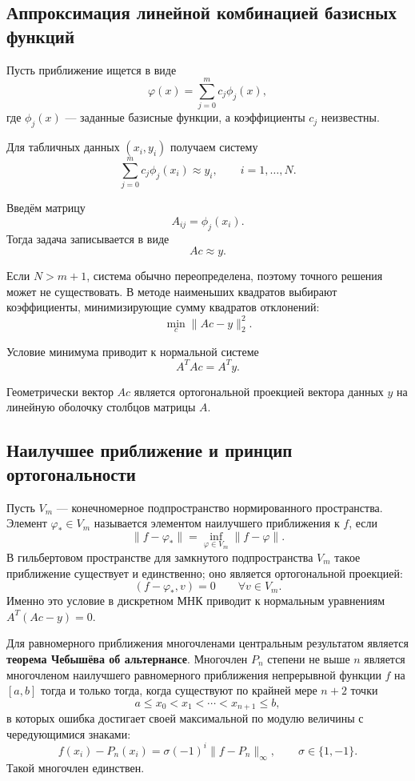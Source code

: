 \subsection{Аппроксимация линейной комбинацией базисных функций}

Пусть приближение ищется в виде
\[
\varphi(x)
=
\sum_{j=0}^{m} c_j\phi_j(x),
\]
где $\phi_j(x)$ --- заданные базисные функции, а коэффициенты $c_j$ неизвестны.

Для табличных данных $(x_i,y_i)$ получаем систему
\[
\sum_{j=0}^{m}c_j\phi_j(x_i)\approx y_i,
\qquad
i=1,\ldots,N.
\]

Введём матрицу
\[
A_{ij}=\phi_j(x_i).
\]
Тогда задача записывается в виде
\[
Ac\approx y.
\]

Если $N>m+1$, система обычно переопределена, поэтому точного решения
может не существовать. В методе наименьших квадратов выбирают коэффициенты,
минимизирующие сумму квадратов отклонений:
\[
\min_c \|Ac-y\|_2^2.
\]

Условие минимума приводит к нормальной системе
\[
A^{T}Ac=A^{T}y.
\]

Геометрически вектор $Ac$ является ортогональной проекцией вектора данных
$y$ на линейную оболочку столбцов матрицы $A$.

\subsection{Наилучшее приближение и принцип ортогональности}

Пусть $V_m$ --- конечномерное подпространство нормированного пространства.
Элемент $\varphi_*\in V_m$ называется элементом наилучшего приближения к $f$, если
\[
    \|f-\varphi_*\|
    =\inf_{\varphi\in V_m}\|f-\varphi\|.
\]
В гильбертовом пространстве для замкнутого подпространства $V_m$ такое
приближение существует и единственно; оно является ортогональной проекцией:
\[
    (f-\varphi_*,v)=0
    \qquad\forall v\in V_m.
\]
Именно это условие в дискретном МНК приводит к нормальным уравнениям
$A^T(Ac-y)=0$.

Для равномерного приближения многочленами центральным результатом является
\textbf{теорема Чебышёва об альтернансе}. Многочлен $P_n$ степени не выше $n$
является многочленом наилучшего равномерного приближения непрерывной функции
$f$ на $[a,b]$ тогда и только тогда, когда существуют по крайней мере $n+2$
точки
\[
    a\le x_0<x_1<\cdots<x_{n+1}\le b,
\]
в которых ошибка достигает своей максимальной по модулю величины с
чередующимися знаками:
\[
    f(x_i)-P_n(x_i)
    =\sigma(-1)^i\|f-P_n\|_\infty,
    \qquad \sigma\in\{1,-1\}.
\]
Такой многочлен единствен.

